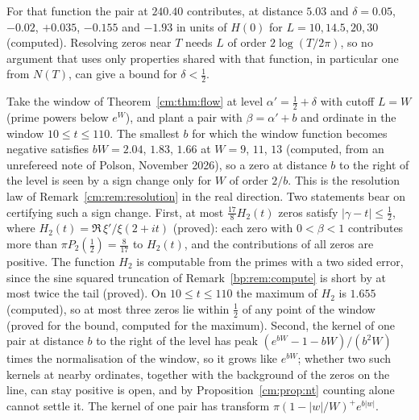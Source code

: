 For that function the pair at $240.40$ contributes, at distance $5.03$ and $\delta=0.05$, $-0.02$, $+0.035$, $-0.155$ and $-1.93$ in units of $H(0)$ for $L=10,14.5,20,30$ (computed). Resolving zeros near $T$ needs $L$ of order $2\log(T/2\pi)$, so no argument that uses only properties shared with that function, in particular one from $N(T)$, can give a bound for $\delta<\frac12$.
\begin{remark}\label{cm:rem:planted}
Take the window of Theorem~\ref{cm:thm:flow} at level $\alpha'=\frac12+\delta$ with cutoff $L=W$ (prime powers below $e^W$), and plant a pair with $\beta=\alpha'+b$ and ordinate in the window $10\le t\le110$. The smallest $b$ for which the window function becomes negative satisfies $bW=2.04$, $1.83$, $1.66$ at $W=9$, $11$, $13$ (computed, from an unrefereed note of Polson, November 2026), so a zero at distance $b$ to the right of the level is seen by a sign change only for $W$ of order $2/b$. This is the resolution law of Remark~\ref{cm:rem:resolution} in the real direction. Two statements bear on certifying such a sign change. First, at most $\frac{17}{8}H_2(t)$ zeros satisfy $|\gamma-t|\le\frac12$, where $H_2(t)=\Re\,\xi'/\xi(2+it)$ (proved): each zero with $0<\beta<1$ contributes more than $\pi P_2(\frac12)=\frac8{17}$ to $H_2(t)$, and the contributions of all zeros are positive. The function $H_2$ is computable from the primes with a two sided error, since the sine squared truncation of Remark~\ref{bp:rem:compute} is short by at most twice the tail (proved). On $10\le t\le110$ the maximum of $H_2$ is $1.655$ (computed), so at most three zeros lie within $\frac12$ of any point of the window (proved for the bound, computed for the maximum). Second, the kernel of one pair at distance $b$ to the right of the level has peak $(e^{bW}-1-bW)/(b^2W)$ times the normalisation of the window, so it grows like $e^{bW}$; whether two such kernels at nearby ordinates, together with the background of the zeros on the line, can stay positive is open, and by Proposition~\ref{cm:prop:nt} counting alone cannot settle it. The kernel of one pair has transform $\pi(1-|w|/W)^+e^{b|w|}$.
\end{remark}


